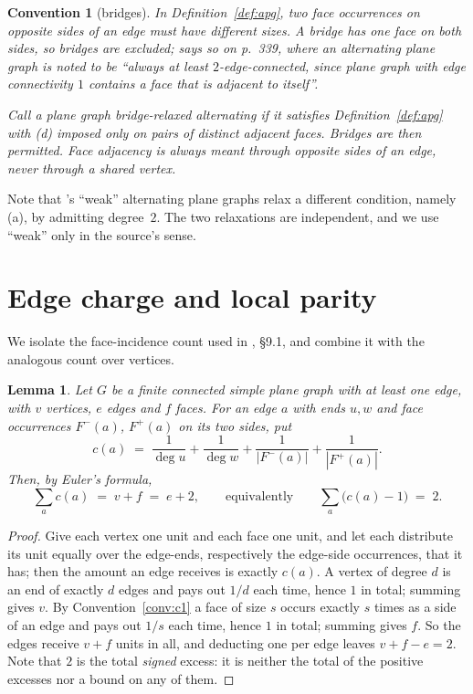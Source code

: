 \documentclass{baustms}
\theoremstyle{cupthm}
\newtheorem{lemma}[theorem]{Lemma}
\theoremstyle{cupdefn}
\newtheorem{convention}[theorem]{Convention}
\theoremstyle{cuprem}
\begin{document}
\begin{convention}[bridges]\label{conv:c2}
In Definition~\ref{def:apg}, two face occurrences on opposite sides of an edge
must have different sizes. A bridge has one face on both sides, so bridges are
excluded; \cite{AHSSV2015} says so on p.~339, where an alternating plane graph is
noted to be ``always at least $2$-edge-connected, since plane graph with edge
connectivity $1$ contains a face that is adjacent to itself''.

Call a plane graph \emph{bridge-relaxed alternating} if it satisfies
Definition~\ref{def:apg} with (d) imposed only on pairs of \emph{distinct}
adjacent faces. Bridges are then permitted. Face adjacency is always meant
through opposite sides of an edge, never through a shared vertex.
\end{convention}

Note that \cite{AHSSV2015}'s ``weak'' alternating plane graphs relax a different
condition, namely (a), by admitting degree~$2$. The two relaxations are
independent, and we use ``weak'' only in the source's sense.

\section{Edge charge and local parity}\label{sec:identity}

We isolate the face-incidence count used in \cite{AHSSV2015}, \S9.1, and combine
it with the analogous count over vertices.

\begin{lemma}\label{lem:identity}
Let $G$ be a finite connected simple plane graph with at least one edge, with $v$
vertices, $e$ edges and $f$ faces. For an edge $a$ with ends $u,w$ and face
occurrences $F^-(a)$, $F^+(a)$ on its two sides, put
\[
  c(a) \;=\; \frac{1}{\deg u} + \frac{1}{\deg w}
           + \frac{1}{|F^-(a)|} + \frac{1}{|F^+(a)|}.
\]
Then, by Euler's formula,
\begin{equation}\label{eq:identity}
  \sum_{a} c(a) \;=\; v + f \;=\; e + 2,
  \qquad\text{equivalently}\qquad
  \sum_{a} \bigl(c(a) - 1\bigr) \;=\; 2 .
\end{equation}
\end{lemma}

\begin{proof}
Give each vertex one unit and each face one unit, and let each distribute its
unit equally over the edge-ends, respectively the edge-side occurrences, that it
has; then the amount an edge receives is exactly $c(a)$. A vertex of degree $d$
is an end of exactly $d$ edges and pays out $1/d$ each time, hence $1$ in total;
summing gives $v$. By Convention~\ref{conv:c1} a face of size $s$ occurs exactly
$s$ times as a side of an edge and pays out $1/s$ each time, hence $1$ in total;
summing gives $f$. So the edges receive $v+f$ units in all, and deducting one per
edge leaves $v+f-e = 2$. Note that $2$ is the total \emph{signed} excess: it is
neither the total of the positive excesses nor a bound on any of them.
\end{proof}
\end{document}
